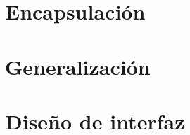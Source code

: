 \documentclass[12pt,letterpaper]{book}
\begin{document}
\section{Encapsulación}
\section{Generalización}
\section{Diseño de interfaz}

\backmatter






%
%
\end{document}
